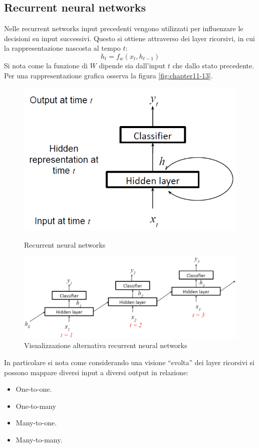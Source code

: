 	\subsection{Recurrent neural networks}
	Nelle recurrent networks input precedenti vengono utilizzati per influenzare le decisioni su input successivi.
	Questo si ottiene attraverso dei layer ricorsivi, in cui la rappresentazione nascosta al tempo $t$:
	$$h_t = f_w(x_t, h_{t-1})$$
	Si nota come la funzione di $W$ dipende sia dall'input $t$ che dallo stato precedente. Per una rappresentazione grafica osserva la figura \ref{fig:chapter11-13}.
	
	\begin{figure}
		\centering
		\begin{minipage}{.5\textwidth}
			\centering
			\includegraphics[width=0.8\linewidth]{imgs/chapter11/img13}
			\caption{Recurrent neural networks}
			\label{fig:chapter11-13}			
		\end{minipage}%
		\begin{minipage}{.5\textwidth}
			\centering
			\includegraphics[width=1\linewidth]{imgs/chapter11/img17}
			\caption{Visualizzazione alternativa recurrent neural networks}
			\label{fig:chapter11-17}
		\end{minipage}
	\end{figure}
	
	
	In particolare si nota come considerando una visione ``svolta'' dei layer ricorsivi si possono mappare diversi input a diversi output in relazione:
	\begin{multicols}{2}
		\begin{itemize}
			\item One-to-one.
			\item One-to-many
			\item Many-to-one.
			\item Many-to-many.
		\end{itemize}
	\end{multicols}

